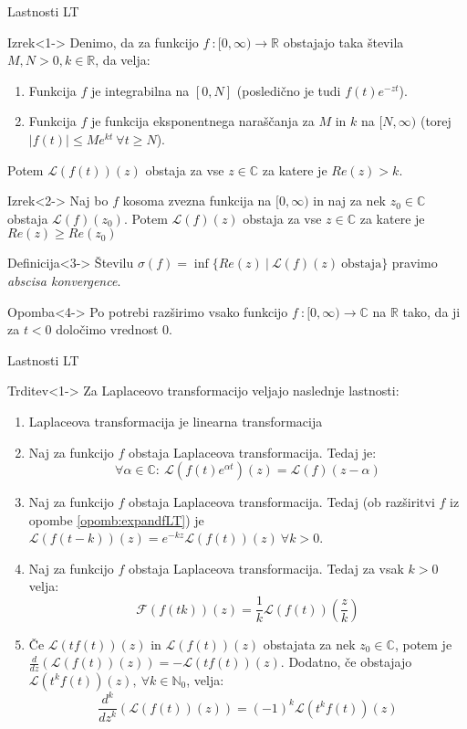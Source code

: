 \documentclass[t, 8pt]{beamer} %
\newcounter{opombe}
\newcommand{\abs}[1]{\ensuremath{\lvert #1 \rvert}}
\newcommand{\mth}[1]{\ensuremath{\mathbb{#1}}}
\newcommand{\R}{\mth{R}}
\newcommand{\No}{\mth{N}_0}
\newcommand{\C}{\mth{C}}
\newcommand{\pojem}[1]{\emph{#1}}
\newcommand{\map}[3]{\ensuremath{{#1}~: {#2} \rightarrow {#3}}}
\newcommand{\fillblack}[1]{
	\begin{tikzpicture}[remember picture, overlay]
		\node [shift={(0 cm,0cm)}]  at (current page.south west)
		{%
			\begin{tikzpicture}[remember picture, overlay] at (current page.south west)
				\draw [fill=black] (0, 0) -- (0,#1 \paperheight) --
				(\paperwidth,#1 \paperheight) -- (\paperwidth,0) -- cycle ;
			\end{tikzpicture}
		};
		\draw (current page.north west) rectangle (current page.south east);
	\end{tikzpicture}
}
\begin{document}
		\begin{frame}{Lastnosti LT}
			\begin{block}{Izrek}<1->
				Denimo, da za funkcijo $\map{f}{[0, \infty)}{\R}$ obstajajo taka števila $M, N > 0, k\in \R$, da velja: \begin{enumerate}
					\item Funkcija $f$ je integrabilna na $[0, N]$ (posledično je tudi $f(t)e^{-zt}$).
					\item Funkcija $f$ je funkcija eksponentnega naraščanja za $M$ in $k$ na $[N, \infty)$ (torej $\abs{f(t)}\leq Me^{kt}~\forall t\geq N$).
				\end{enumerate}
				Potem $\mathcal{L}(f(t))(z)$ obstaja za vse $z\in\C$ za katere je $Re(z) > k$.
			\end{block}
			
			\begin{block}{Izrek}<2->
				Naj bo $f$ kosoma zvezna funkcija na $[0, \infty)$ in naj za nek $z_0\in\C$ obstaja $\mathcal{L}(f)(z_0)$. Potem $\mathcal{L}(f)(z)$ obstaja za vse $z\in\C$ za katere je $Re(z) \geq Re(z_0)$
			\end{block}
			
			\begin{block}{Definicija}<3->
				Številu $\sigma(f) = \inf\{Re(z)~|~\mathcal{L}(f)(z)~\text{obstaja}\}$ pravimo \pojem{abscisa konvergence}.
			\end{block}
			\begin{block}{Opomba}<4->
				Po potrebi razširimo vsako funkcijo $\map{f}{[0,\infty)}{\C}$ na $\R$ tako, da ji za $t<0$ določimo vrednost $0$.
			\end{block}
		\end{frame}
		
		\begin{frame}{Lastnosti LT}
			\begin{block}{Trditev}<1->
				Za Laplaceovo transformacijo veljajo naslednje lastnosti: \begin{enumerate}
					\item Laplaceova transformacija je linearna transformacija
					\item Naj za funkcijo $f$ obstaja Laplaceova transformacija. Tedaj je: $$\forall \alpha\in\C:~\mathcal{L}(f(t)e^{\alpha t})(z) = \mathcal{L}(f)(z-\alpha)$$
					\item Naj za funkcijo $f$ obstaja Laplaceova transformacija. Tedaj (ob razširitvi $f$ iz opombe \ref{opomb:expandfLT}) je $\mathcal{L}(f(t-k))(z) = e^{-kz}\mathcal{L}(f(t))(z)~\forall k > 0$.
					\item Naj za funkcijo $f$ obstaja Laplaceova transformacija. Tedaj za vsak $k>0$ velja: $$\mathcal{F}(f(tk))(z) = \frac{1}{k}\mathcal{L}(f(t))(\frac{z}{k})$$
					\item Če $\mathcal{L}(tf(t))(z)$ in $\mathcal{L}(f(t))(z)$ obstajata za nek $z_0\in\C$, potem je $\frac{d}{dz}(\mathcal{L}(f(t))(z)) = -\mathcal{L}(tf(t))(z)$. Dodatno, če obstajajo $\mathcal{L}(t^kf(t))(z),~\forall k\in\No$, velja: $$\frac{d^k}{dz^k}(\mathcal{L}(f(t))(z)) = (-1)^k\mathcal{L}(t^kf(t))(z)$$
				\end{enumerate}
			\end{block}
		\end{frame}
		
\end{document}
